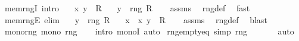 \begin{isabellebody}
\isanewline
{}\isamarkupfalse%
\ mem{\isacharunderscore}{\kern0pt}rngI\ {\isacharbrackleft}{\kern0pt}intro{\isacharbrackright}{\kern0pt}{\isacharcolon}{\kern0pt}\isanewline
\ \ \ {\isachardoublequoteopen}{\isasymlangle}x{\isacharcomma}{\kern0pt}\ y{\isasymrangle}\ {\isasymin}\ R{\isachardoublequoteclose}\isanewline
\ \ \ {\isachardoublequoteopen}y\ {\isasymin}\ rng\ R{\isachardoublequoteclose}\isanewline
%
\isadelimproof
\ \ %
\endisadelimproof
%
\isatagproof
{}\isamarkupfalse%
\ assms\ \isamarkupfalse%
\ rng{\isacharunderscore}{\kern0pt}def\ \isamarkupfalse%
\ fast%
\endisatagproof
{\isafoldproof}%
%
\isadelimproof
\isanewline
%
\endisadelimproof
\isanewline
{}\isamarkupfalse%
\ mem{\isacharunderscore}{\kern0pt}rngE\ {\isacharbrackleft}{\kern0pt}elim{\isacharbang}{\kern0pt}{\isacharbrackright}{\kern0pt}{\isacharcolon}{\kern0pt}\isanewline
\ \ \ {\isachardoublequoteopen}y\ {\isasymin}\ rng\ R{\isachardoublequoteclose}\isanewline
\ \ \ x\ \ {\isachardoublequoteopen}{\isasymlangle}x{\isacharcomma}{\kern0pt}\ y{\isasymrangle}\ {\isasymin}\ R{\isachardoublequoteclose}\isanewline
%
\isadelimproof
\ \ %
\endisadelimproof
%
\isatagproof
{}\isamarkupfalse%
\ assms\ \isamarkupfalse%
\ rng{\isacharunderscore}{\kern0pt}def\ \isamarkupfalse%
\ blast%
\endisatagproof
{\isafoldproof}%
%
\isadelimproof
\isanewline
%
\endisadelimproof
\isanewline
{}\isamarkupfalse%
\ mono{\isacharunderscore}{\kern0pt}rng{\isacharcolon}{\kern0pt}\ {\isachardoublequoteopen}mono\ rng{\isachardoublequoteclose}\isanewline
%
\isadelimproof
\ \ %
\endisadelimproof
%
\isatagproof
{}\isamarkupfalse%
\ {\isacharparenleft}{\kern0pt}intro\ monoI{\isacharparenright}{\kern0pt}\ auto%
\endisatagproof
{\isafoldproof}%
%
\isadelimproof
\isanewline
%
\endisadelimproof
\isanewline
{}\isamarkupfalse%
\ rng{\isacharunderscore}{\kern0pt}empty{\isacharunderscore}{\kern0pt}eq\ {\isacharbrackleft}{\kern0pt}simp{\isacharbrackright}{\kern0pt}{\isacharcolon}{\kern0pt}\ {\isachardoublequoteopen}rng\ {\isacharbraceleft}{\kern0pt}{\isacharbraceright}{\kern0pt}\ {\isacharequal}{\kern0pt}\ {\isacharbraceleft}{\kern0pt}{\isacharbraceright}{\kern0pt}{\isachardoublequoteclose}\isanewline
%
\isadelimproof
\ \ %
\endisadelimproof
%
\isatagproof
{}\isamarkupfalse%
\ auto%
\endisatagproof
{\isafoldproof}%
%
\isadelimproof
\isanewline
%
\endisadelimproof

\end{isabellebody}
